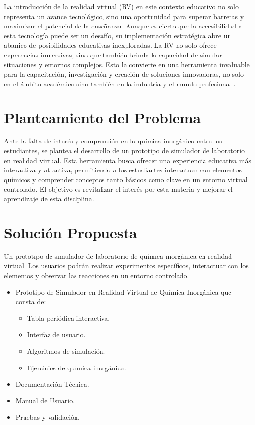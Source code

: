 La introducción de la realidad virtual (RV) en este contexto educativo no solo representa un avance tecnológico, sino una oportunidad para superar barreras y maximizar el potencial de la enseñanza. Aunque es cierto que la accesibilidad a esta tecnología puede ser un desafío, su implementación estratégica abre un abanico de posibilidades educativas inexploradas. La RV no solo ofrece experencias inmersivas, sino que también brinda la capacidad de simular situaciones y entornos complejos. Esto la convierte en una herramienta invaluable para la capacitación, investigación y creación de soluciones innovadoras, no solo en el ámbito académico sino también en la industria y el mundo profesional \cite{Zapatero2011}.

\section{Planteamiento del Problema}
Ante la falta de interés y comprensión en la química inorgánica entre los estudiantes, se plantea el desarrollo de un prototipo de simulador de laboratorio en realidad virtual. Esta herramienta busca ofrecer una experiencia educativa más interactiva y atractiva, permitiendo a los estudiantes interactuar con elementos químicos y comprender conceptos tanto básicos como clave en un entorno virtual controlado. El objetivo es revitalizar el interés por esta materia y mejorar el aprendizaje de esta disciplina.

\section{Solución Propuesta}
Un prototipo de simulador de laboratorio de química inorgánica en realidad virtual. Los usuarios podrán realizar experimentos específicos, interactuar con los elementos y observar las reacciones en un entorno controlado.

\begin{itemize}
  \item Prototipo de Simulador en Realidad Virtual de Química Inorgánica que consta de:
    \begin{itemize}
        \item Tabla periódica interactiva.
        \item Interfaz de usuario.
        \item Algoritmos de simulación.
        \item Ejercicios de química inorgánica.
    \end{itemize}
  \item Documentación Técnica.
  \item Manual de Usuario.
  \item Pruebas y validación.
\end{itemize}

